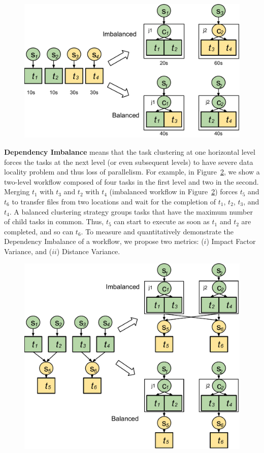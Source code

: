 \begin{figure}[htb]
	\centering
	\includegraphics[width=0.95\linewidth]{figures/imbalance/runtime_variance.pdf}
	\label{fig:imbalance_rv}
\end{figure}


\textbf{Dependency Imbalance} means that the task clustering at one horizontal level forces the tasks at the next level (or even subsequent levels) to have severe data locality problem and thus loss of parallelism. For example, in Figure~\ref{fig:imbalance_dv}, we show a two-level workflow composed of four tasks in the first level and two in the second. Merging $t_1$ with $t_3$ and $t_2$ with $t_4$ (imbalanced workflow in Figure~\ref{fig:imbalance_dv}) forces $t_5$ and $t_6$ to transfer files from two locations and wait for the completion of $t_1$, $t_2$, $t_3$, and $t_4$.  A balanced clustering strategy groups tasks that have the maximum number of child tasks in common. Thus, $t_5$ can start to execute as soon as $t_1$ and $t_2$ are completed, and so can $t_6$. To measure and quantitatively demonstrate the Dependency Imbalance of a workflow, we propose two  metrics: ($i$) Impact Factor Variance, and ($ii$) Distance Variance. 

\begin{figure}[htb]
	\centering
	\includegraphics[width=0.95\linewidth]{figures/imbalance/dv.pdf}
	\label{fig:imbalance_dv}
\end{figure}

